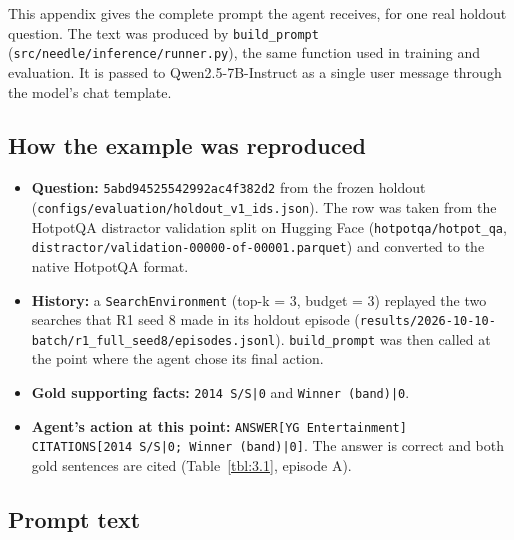 
This appendix gives the complete prompt the agent receives, for one real
holdout question. The text was produced by
\texttt{build\_\allowbreak{}prompt}
(\texttt{src/\allowbreak{}needle/\allowbreak{}inference/\allowbreak{}runner.\allowbreak{}py}),
the same function used in training and evaluation. It is passed to
Qwen2.5-7B-Instruct as a single user message through the model's chat
template.

\subsection{How the example was
reproduced}\label{how-the-example-was-reproduced}

\begin{itemize}
\tightlist
\item
  \textbf{Question:}
  \texttt{5abd\allowbreak{}9452\allowbreak{}5542\allowbreak{}992a\allowbreak{}c4f3\allowbreak{}82d2\allowbreak{}}
  from the frozen holdout
  (\texttt{configs/\allowbreak{}evaluation/\allowbreak{}holdout\_\allowbreak{}v1\_\allowbreak{}ids.\allowbreak{}json}).
  The row was taken from the HotpotQA distractor validation split on
  Hugging Face (\texttt{hotpotqa/\allowbreak{}hotpot\_\allowbreak{}qa},
  \texttt{distractor/\allowbreak{}validation-\allowbreak{}00000-\allowbreak{}of-\allowbreak{}00001.\allowbreak{}parquet})
  and converted to the native HotpotQA format.
\item
  \textbf{History:} a \texttt{SearchEnvironment} (top-k = 3, budget = 3)
  replayed the two searches that R1 seed 8 made in its holdout episode
  (\texttt{results/\allowbreak{}2026-\allowbreak{}10-\allowbreak{}10-\allowbreak{}batch/\allowbreak{}r1\_\allowbreak{}full\_\allowbreak{}seed8/\allowbreak{}episodes.\allowbreak{}jsonl}).
  \texttt{build\_\allowbreak{}prompt} was then called at the point where
  the agent chose its final action.
\item
  \textbf{Gold supporting facts:} \texttt{2014 S/\allowbreak{}S|0} and
  \texttt{Winner (band)|0}.
\item
  \textbf{Agent's action at this point:}
  \texttt{ANSWER{[}\allowbreak{}YG Entertainment{]} CITATIONS{[}\allowbreak{}2014 S/\allowbreak{}S|0; Winner (band)|0{]}}.
  The answer is correct and both gold sentences are cited
  (Table~\ref{tbl:3.1}, episode A).
\end{itemize}

\subsection{Prompt text}\label{prompt-text}

